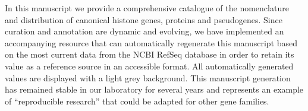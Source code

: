 
  In this manuscript we provide a comprehensive catalogue of the nomenclature and distribution 
  of canonical histone genes, proteins and pseudogenes. 
  Since curation and annotation are dynamic and evolving, we have implemented an accompanying resource 
  that can automatically regenerate this manuscript based on the most current data from the NCBI RefSeq database 
  in order to retain its value as a reference source in an accessible format.
  All automatically generated values are displayed with a light grey background.
  This manuscript generation has remained stable in our laboratory for several years
  and represents an example of ``reproducible research'' 
  that could be adapted for other gene families.


